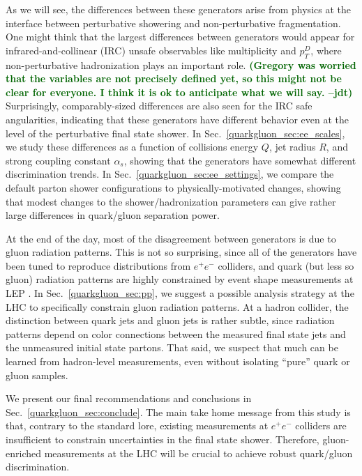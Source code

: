 \documentclass[11pt]{cernrep}
\newcommand{\jdt}[1]{\textbf{\textcolor{darkgreen}{(#1 --jdt)}}}
\begin{document}
As we will see, the differences between these generators arise from
physics at the interface between perturbative showering and
non-perturbative fragmentation.  One might think that the largest
differences between generators would appear for infrared-and-collinear
(IRC) unsafe observables like multiplicity and $p_T^D$, where
non-perturbative hadronization plays an important role. \jdt{Gregory was worried that the
  variables are not precisely defined yet, so this might not be clear
  for everyone.  I think it is ok to anticipate what we will say.} Surprisingly, comparably-sized differences are also
seen for the IRC safe angularities, indicating that these generators
have different behavior even at the level of the perturbative final
state shower.  In Sec.~\ref{quarkgluon_sec:ee_scales}, we study these
differences as a function of collisions energy $Q$, jet radius $R$,
and strong coupling constant $\alpha_s$, showing that the generators
have somewhat different discrimination trends.  In
Sec.~\ref{quarkgluon_sec:ee_settings}, we compare the default parton
shower configurations to physically-motivated changes, showing that
modest changes to the shower/hadronization parameters can give rather
large differences in quark/gluon separation power.

At the end of the day, most of the disagreement between generators is due to gluon radiation patterns.  This is not so surprising, since all of the generators have been tuned to reproduce distributions from $e^+ e^-$ colliders, and quark (but less so gluon) radiation patterns are highly constrained by event shape measurements at LEP \cite{Heister:2003aj,Abdallah:2003xz,Achard:2004sv,Abbiendi:2004qz}.  In Sec.~\ref{quarkgluon_sec:pp}, we suggest a possible analysis strategy at the LHC to specifically constrain gluon radiation patterns.  At a hadron collider, the distinction between quark jets and gluon jets is rather subtle, since radiation patterns depend on color connections between the measured final state jets and the unmeasured initial state partons.  That said, we suspect that much can be learned from hadron-level measurements, even without isolating ``pure'' quark or gluon samples.

We present our final recommendations and conclusions in
Sec.~\ref{quarkgluon_sec:conclude}.  The main take home message from
this study is that, contrary to the standard lore, existing
measurements at $e^+e^-$ colliders are insufficient to constrain
uncertainties in the final state shower.  Therefore, gluon-enriched
measurements at the LHC will be crucial to achieve robust quark/gluon
discrimination.
\end{document}
